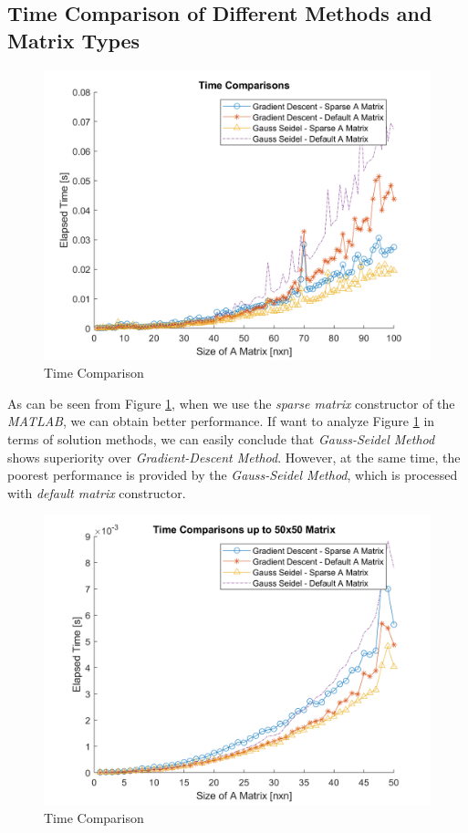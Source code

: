 \documentclass[letterpaper,12pt]{article}
\begin{document}
   \subsection{Time Comparison of Different Methods and Matrix Types}
   
\begin{figure}[H] 
   \centering \includegraphics[width=\columnwidth]{figures/linsystime.png}           
                \caption{Time Comparison}                
                   \label{fig:linsystime}
   \end{figure}
   As can be seen from Figure \ref{fig:linsystime}, when we use the \textit{sparse matrix} constructor of the \textit{MATLAB}, we can obtain better performance. If want to analyze Figure \ref{fig:linsystime} in terms of solution methods, we can easily conclude that \textit{Gauss-Seidel Method} shows superiority over \textit{Gradient-Descent Method}. However, at the same time, the poorest performance is provided by the \textit{Gauss-Seidel Method}, which is processed with \textit{default matrix} constructor.
\begin{figure}[H] 
   \centering \includegraphics[width=\columnwidth]{figures/linsystime50.png}           
                  \caption{Time Comparison}                
                     \label{fig:linsystime50}
   \end{figure}
\end{document}
